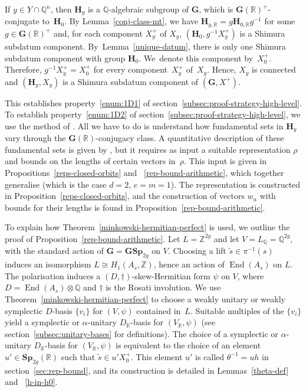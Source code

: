 \documentclass[JEP,XML,SOM,Unicode,NoFloatCountersInSection]{cedram}
\newcommand{\bQ}{\mathbb{Q}}
\newcommand{\bR}{\mathbb{R}}
\newcommand{\bZ}{\mathbb{Z}}
\newcommand{\gG}{\mathbf{G}}
\newcommand{\gGSp}{\mathbf{GSp}}
\newcommand{\gH}{\mathbf{H}}
\newcommand{\gSp}{\mathbf{Sp}}
\DeclareMathOperator{\End}{End}
\begin{document}
If $y \in Y \cap \bQ^n$, then $\gH_y$ is a $\bQ$-algebraic subgroup of $\gG$, which is $\gG(\bR)^+$-conjugate to~$\gH_0$.
By Lemma~\ref{conj-class-mt}, we have $\gH_{y,\bR} = g\gH_{0,\bR}g^{-1}$ for some $g \in \gG(\bR)^+$ and, for each component $X_y^+$ of $X_y$, $(\gH_0, g^{-1}X_y^+)$ is a Shimura subdatum component.
By~Lem\-ma~\ref{unique-datum}, there is only one Shimura subdatum component with group $\gH_0$.
We~denote this component by~$X^+_0$. Therefore, $g^{-1}X_y^+=X^+_0$ for every component~$X_y^+$ of~$X_y$.
Hence, $X_y$ is connected and $(\gH_y, X_y)$ is a Shimura subdatum component of $(\gG, X^+)$.

This establishes property~\eqref{enum:1D1} of section~\ref{subsec:proof-strategy-high-level}. To establish property~\eqref{enum:1D2} of section~\ref{subsec:proof-strategy-high-level}, we use the method of \cite[Prop.\,6.3]{QRTUI}.
All we have to do is understand how fundamental sets in $\gH_y$ vary through the $\gG(\bR)$-conjugacy class.
A quantitative description of these fundamental sets is given by \cite[Th.\,1.2]{QRTUI}, but it requires as input a suitable representation $\rho$ and bounds on the lengths of certain vectors in~$\rho$.
This input is given in Propositions~\ref{reps-closed-orbits} and~ \ref{rep-bound-arithmetic}, which together generalise \cite[Prop.\,5.1]{QRTUI} (which is the case $d=2$, $e=m=1$).
The representation is constructed in Proposition~\ref{reps-closed-orbits}, and the construction of vectors $w_u$ with bounds for their lengths is found in Proposition~\ref{rep-bound-arithmetic}.

To explain how Theorem~\ref{minkowski-hermitian-perfect} is used, we outline the proof of Proposition~\ref{rep-bound-arithmetic}. Let $L = \bZ^{2g}$ and let $V = L_\bQ = \bQ^{2g}$, with the standard action of $\gG=\gGSp_{2g}$ on $V$. Choosing a lift $\tilde s \in \pi^{-1}(s)$ induces an isomorphism $L \cong H_1(A_s, \bZ)$, hence an action of $\End(A_s)$ on $L$. The polarisation induces a $(D,\dag)$-skew-Hermitian form $\psi$ on $V$, where $D = \End(A_s) \otimes \bQ$ and $\dag$ is the Rosati involution.
We use Theorem~\ref{minkowski-hermitian-perfect} to choose a weakly unitary or weakly symplectic $D$-basis $\{v_i\}$ for $(V, \psi)$ contained in~$L$.
Suitable multiples of the $\{v_i\}$ yield a symplectic or $\alpha$-unitary $D_\bR$-basis for $(V_\bR, \psi)$ (see section~\ref{subsec:unitary-bases} for definitions).
The choice of a symplectic or $\alpha$-unitary $D_\bR$-basis for $(V_\bR, \psi)$ is equivalent to the choice of an element $u' \in \gSp_{2g}(\bR)$ such that $\tilde s \in u'X_0^+$.
This element $u'$ is called $\theta^{-1}=uh$ in section~\ref{sec:rep-bound}, and its construction is detailed in Lemmas~\ref{theta-def} and~ \ref{h-in-h0}.
\end{document}
